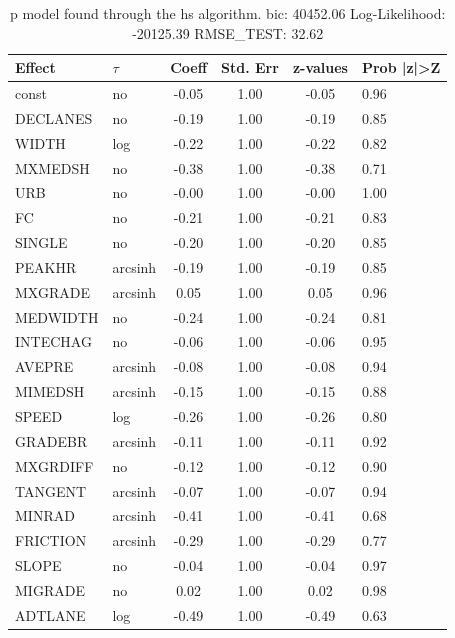 \begin{table}
	\caption{p model found through the hs algorithm. bic: 40452.06 Log-Likelihood: -20125.39 RMSE_TEST: 32.62}
	\begin{center}
		\begin{tabular}{|l|l|c|c|c|l|}
			\hline
			Effect & $\tau$ & Coeff & Std. Err & z-values & Prob |z|>Z \\
			\hline
			const & no & -0.05 & 1.00 & -0.05 & 0.96 \\
			\hline
			DECLANES & no & -0.19 & 1.00 & -0.19 & 0.85 \\
			\hline
			WIDTH & log & -0.22 & 1.00 & -0.22 & 0.82 \\
			\hline
			MXMEDSH & no & -0.38 & 1.00 & -0.38 & 0.71 \\
			\hline
			URB & no & -0.00 & 1.00 & -0.00 & 1.00 \\
			\hline
			FC & no & -0.21 & 1.00 & -0.21 & 0.83 \\
			\hline
			SINGLE & no & -0.20 & 1.00 & -0.20 & 0.85 \\
			\hline
			PEAKHR & arcsinh & -0.19 & 1.00 & -0.19 & 0.85 \\
			\hline
			MXGRADE & arcsinh & 0.05 & 1.00 & 0.05 & 0.96 \\
			\hline
			MEDWIDTH & no & -0.24 & 1.00 & -0.24 & 0.81 \\
			\hline
			INTECHAG & no & -0.06 & 1.00 & -0.06 & 0.95 \\
			\hline
			AVEPRE & arcsinh & -0.08 & 1.00 & -0.08 & 0.94 \\
			\hline
			MIMEDSH & arcsinh & -0.15 & 1.00 & -0.15 & 0.88 \\
			\hline
			SPEED & log & -0.26 & 1.00 & -0.26 & 0.80 \\
			\hline
			GRADEBR & arcsinh & -0.11 & 1.00 & -0.11 & 0.92 \\
			\hline
			MXGRDIFF & no & -0.12 & 1.00 & -0.12 & 0.90 \\
			\hline
			TANGENT & arcsinh & -0.07 & 1.00 & -0.07 & 0.94 \\
			\hline
			MINRAD & arcsinh & -0.41 & 1.00 & -0.41 & 0.68 \\
			\hline
			FRICTION & arcsinh & -0.29 & 1.00 & -0.29 & 0.77 \\
			\hline
			SLOPE & no & -0.04 & 1.00 & -0.04 & 0.97 \\
			\hline
			MIGRADE & no & 0.02 & 1.00 & 0.02 & 0.98 \\
			\hline
			ADTLANE & log & -0.49 & 1.00 & -0.49 & 0.63 \\

\end{tabular}
\end{center}
\end{table}
